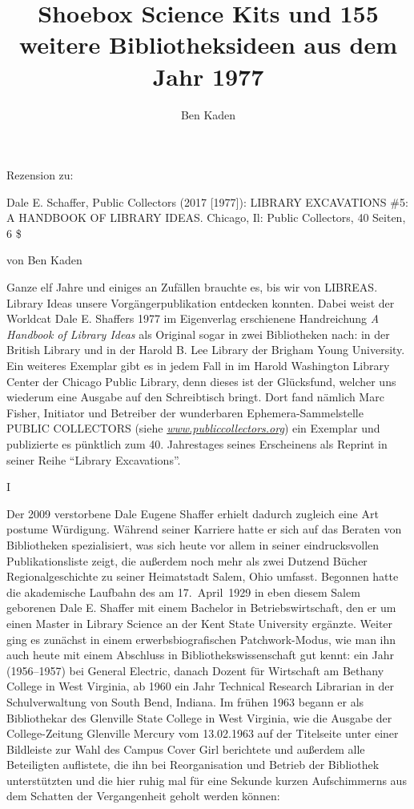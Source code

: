 \documentclass[a4paper,
fontsize=11pt,
oneside,
numbers=noperiodatend,
parskip=half-,
bibliography=totoc,
final
]{scrartcl}
\title{\LARGE{Shoebox Science Kits und 155 weitere Bibliotheksideen aus dem Jahr 1977}} %
\author{Ben Kaden} %
\date{}
\begin{document}
\maketitle
\thispagestyle{fancyplain} 


Rezension zu:

Dale E. Schaffer, Public Collectors (2017 {[}1977{]}): LIBRARY
EXCAVATIONS \#5: A HANDBOOK OF LIBRARY IDEAS. Chicago, Il: Public
Collectors, 40 Seiten, 6 \$

von Ben Kaden

Ganze elf Jahre und einiges an Zufällen brauchte es, bis wir von
LIBREAS. Library Ideas unsere Vorgängerpublikation entdecken konnten.
Dabei weist der Worldcat Dale E. Shaffers 1977 im Eigenverlag
erschienene Handreichung \emph{A Handbook of Library Ideas} als Original
sogar in zwei Bibliotheken nach: in der British Library und in der
Harold B. Lee Library der Brigham Young University. Ein weiteres
Exemplar gibt es in jedem Fall in im Harold Washington Library Center
der Chicago Public Library, denn dieses ist der Glücksfund, welcher uns
wiederum eine Ausgabe auf den Schreibtisch bringt. Dort fand nämlich
Marc Fisher, Initiator und Betreiber der wunderbaren
Ephemera-Sammelstelle PUBLIC COLLECTORS (siehe
\href{http://www.publiccollectors.org}{\emph{www.publiccollectors.org}})
ein Exemplar und publizierte es pünktlich zum 40. Jahrestages seines
Erscheinens als Reprint in seiner Reihe \enquote{Library Excavations}.

I

Der 2009 verstorbene Dale Eugene Shaffer erhielt dadurch zugleich eine
Art postume Würdigung. Während seiner Karriere hatte er sich auf das
Beraten von Bibliotheken spezialisiert, was sich heute vor allem in
seiner eindrucksvollen Publikationsliste zeigt, die außerdem noch mehr
als zwei Dutzend Bücher Regionalgeschichte zu seiner Heimatstadt Salem,
Ohio umfasst. Begonnen hatte die akademische Laufbahn des am
17.~April~1929 in eben diesem Salem geborenen Dale E. Shaffer mit einem
Bachelor in Betriebswirtschaft, den er um einen Master in Library
Science an der Kent State University ergänzte. Weiter ging es zunächst
in einem erwerbsbiografischen Patchwork-Modus, wie man ihn auch heute
mit einem Abschluss in Bibliothekswissenschaft gut kennt: ein Jahr
(1956--1957) bei General Electric, danach Dozent für Wirtschaft am
Bethany College in West Virginia, ab 1960 ein Jahr Technical Research
Librarian in der Schulverwaltung von South Bend, Indiana. Im frühen 1963
begann er als Bibliothekar des Glenville State College in West Virginia,
wie die Ausgabe der College-Zeitung Glenville Mercury vom 13.02.1963 auf
der Titelseite unter einer Bildleiste zur Wahl des Campus Cover Girl
berichtete und außerdem alle Beteiligten auflistete, die ihn bei
Reorganisation und Betrieb der Bibliothek unterstützten und die hier
ruhig mal für eine Sekunde kurzen Aufschimmerns aus dem Schatten der
Vergangenheit geholt werden können:
\end{document}
